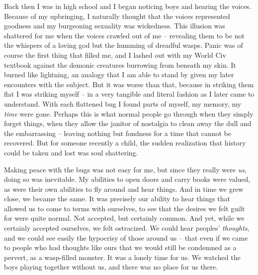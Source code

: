 Back then I was in high school and I began noticing boys and hearing the voices. Because of my upbringing, I naturally thought that the voices represented goodness and my burgeoning sexuality was wickedness. This illusion was shattered for me when the voices crawled out of me -- revealing them to be not the whispers of a loving god but the humming of dreadful wasps. Panic was of course the first thing that filled me, and I lashed out with my World Civ textbook against the demonic creatures burrowing from beneath my skin. It burned like lightning, an analogy that I am able to stand by given my later encounters with the subject. But it was worse than that, because in striking them flat I was striking myself -- in a very tangible and literal fashion as I later came to understand. With each flattened bug I found parts of myself, my memory, my \textit{time} were gone. Perhaps this is what normal people go through when they simply forget things, when they allow the janitor of nostalgia to clean away the dull and the embarrassing -- leaving nothing but fondness for a time that cannot be recovered. But for someone recently a child, the sudden realization that history could be taken and lost was soul shattering.

Making peace with the bugs was not easy for me, but since they really were \textit{us}, doing so was inevitable. My abilities to open doors and carry books were valued, as were their own abilities to fly around and hear things. And in time we grew close, we became the same. It was precisely our ability to hear things that allowed us to come to terms with ourselves, to see that the desires we felt guilt for were quite normal. Not accepted, but certainly common. And yet, while we certainly accepted ourselves, we felt ostracized. We could hear peoples' \textit{thoughts}, and we could see easily the hypocrisy of those around us -- that even if we came to people who had thoughts like ours that we would still be condemned as a pervert, as a wasp-filled monster. It was a lonely time for us. We watched the boys playing together without us, and there was no place for us there.

